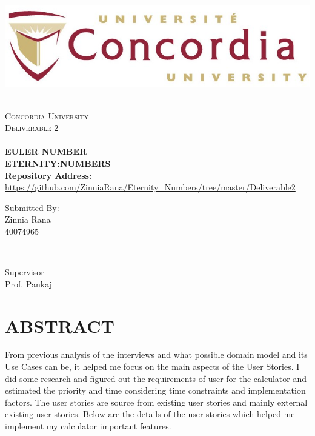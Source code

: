 \documentclass[12pt]{article}
\begin{document}
\begin{titlepage}

\newcommand{\HRule}{\rule{\linewidth}{0.5mm}} 

\center 
 \includegraphics[width=0.4\columnwidth]{concordia-logo.png} 

\textsc{}  \\[2cm]
\textsc{\LARGE Concordia University}\\[1.5cm] 
\textsc{\Large Deliverable 2}\\[0.5cm] 
\textsc{\large }\\[0.5cm] 

{ \huge \bfseries EULER NUMBER}\\[0.5cm]
{ \normalsize \bfseries ETERNITY:NUMBERS}\\[1cm]

 \noident \textbf{Repository Address: }{\url{https://github.com/ZinniaRana/Eternity_Numbers/tree/master/Deliverable2}}\\[2cm]

\begin{minipage}{0.4\textwidth}
\begin{flushleft} \large
\text Submitted By:\\
Zinnia Rana \\
40074965
\end{flushleft}
\end{minipage}
~
\begin{minipage}{0.4\textwidth}
\begin{flushright} \large
Supervisor \\
Prof. Pankaj  
\end{flushright}
\end{minipage}


\end{titlepage}


\section*{ABSTRACT} %
\raggedright From previous analysis of the interviews and what possible domain model and its Use Cases can be, it helped me focus on the main aspects of the User Stories. I did some research and figured out the requirements of user for the calculator and estimated the priority and time considering time constraints and implementation factors. The user stories are source from existing user stories and mainly external existing user stories. Below are the details of the user stories which helped me implement my calculator important features.\\[2cm]
\end{document}
